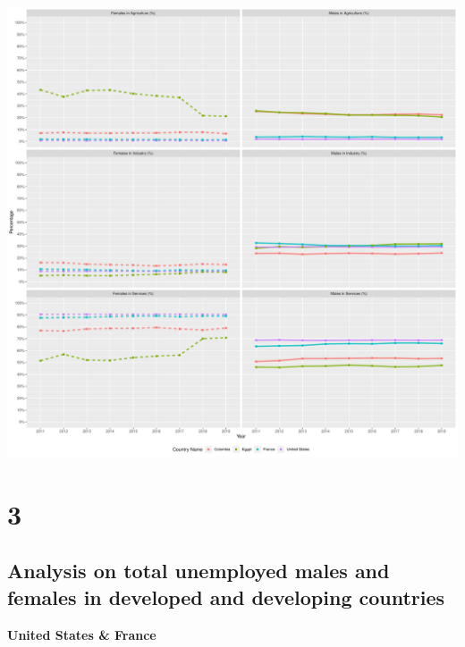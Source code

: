 \documentclass[
]{article}
\begin{document}
\includegraphics{The_Outsiders_5513_files/figure-latex/allvars-1.pdf}

\clearpage

\section*{3}

\hypertarget{analysis-on-total-unemployed-males-and-females-in-developed-and-developing-countries}{%
\subsection{Analysis on total unemployed males and females in developed
and developing
countries}\label{analysis-on-total-unemployed-males-and-females-in-developed-and-developing-countries}}

\textbf{United States \& France}
\end{document}
